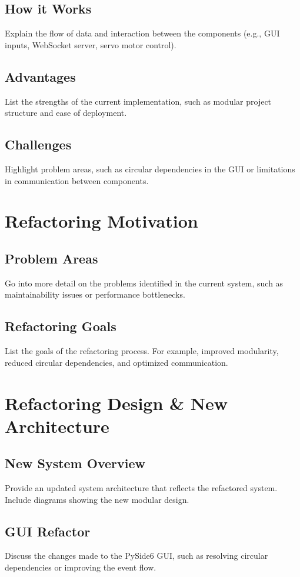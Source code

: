 \documentclass[twocolumn]{article}
\begin{document}
\subsection{How it Works}
Explain the flow of data and interaction between the components (e.g., GUI inputs, WebSocket server, servo motor control).

\subsection{Advantages}
List the strengths of the current implementation, such as modular project structure and ease of deployment.

\subsection{Challenges}
Highlight problem areas, such as circular dependencies in the GUI or limitations in communication between components.

\section{Refactoring Motivation}
\subsection{Problem Areas}
Go into more detail on the problems identified in the current system, such as maintainability issues or performance bottlenecks.

\subsection{Refactoring Goals}
List the goals of the refactoring process. For example, improved modularity, reduced circular dependencies, and optimized communication.

\section{Refactoring Design \& New Architecture}
\subsection{New System Overview}
Provide an updated system architecture that reflects the refactored system. Include diagrams showing the new modular design.

\subsection{GUI Refactor}
Discuss the changes made to the PySide6 GUI, such as resolving circular dependencies or improving the event flow.
\end{document}
